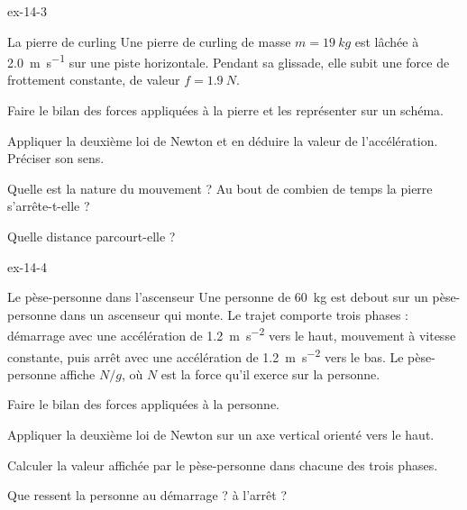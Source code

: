 \begin{blocLivre}{ex-14-3}
\begin{exercice}[1]{La pierre de curling}
Une pierre de curling de masse $m=\qty{19}{kg}$ est lâchée à \qty{2,0}{m.s^{-1}} sur une piste horizontale. Pendant sa
glissade, elle subit une force de frottement constante, de valeur $f=\qty{1,9}{N}$.
\begin{questions}
\item Faire le bilan des forces appliquées à la pierre et les représenter sur un schéma.
\item Appliquer la deuxième loi de Newton et en déduire la valeur de l'accélération. Préciser son sens.
\item Quelle est la nature du mouvement ? Au bout de combien de temps la pierre s'arrête-t-elle ?
\item Quelle distance parcourt-elle ?
\end{questions}
\end{exercice}
\end{blocLivre}
\begin{blocLivre}{ex-14-4}
\begin{exercice}[1]{Le pèse-personne dans l'ascenseur}
Une personne de 60~kg est debout sur un pèse-personne dans un ascenseur qui monte. Le trajet comporte trois phases :
démarrage avec une accélération de \qty{1,2}{m.s^{-2}} vers le haut, mouvement à vitesse constante, puis arrêt avec une
accélération de \qty{1,2}{m.s^{-2}} vers le bas. Le pèse-personne affiche $N/g$, où $N$ est la force qu'il exerce sur
la personne.
\begin{questions}
\item Faire le bilan des forces appliquées à la personne.
\item Appliquer la deuxième loi de Newton sur un axe vertical orienté vers le haut.
\item Calculer la valeur affichée par le pèse-personne dans chacune des trois phases.
\item Que ressent la personne au démarrage ? à l'arrêt ?
\end{questions}
\end{exercice}
\end{blocLivre}
